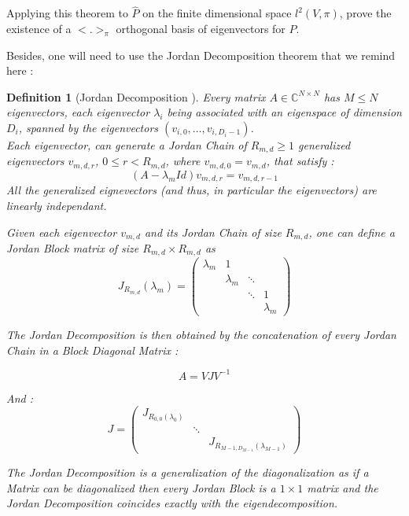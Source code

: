 \documentclass{article}
\newtheorem{definition}{Definition}[section]
\begin{document}
Applying this theorem to $\hat{P}$ on the finite dimensional space $l^2(V, \pi)$, prove the existence of a $<.>_{\pi}$ orthogonal basis of eigenvectors for $\hat{P}$.

Besides, one will need to use the Jordan Decomposition theorem that we remind here :

\begin{definition}[Jordan Decomposition \cite{sandryhaila_moura_2014}]\label{def:Jordan_decomposition}
Every matrix $A \in \mathbb{C}^{N \times N}$ has $M \leq N$ eigenvectors, each eigenvector $\lambda_i$ being associated with an eigenspace of dimension $D_i$, spanned by the eigenvectors $(v_{i,0}, \hdots, v_{i, D_i - 1})$.\\
Each eigenvector, can generate a \textit{Jordan Chain} of $R_{m,d} \geq 1$ \textit{generalized eigenvectors} $v_{m,d,r}$, $0 \leq r < R_{m,d}$, where $v_{m,d,0} = v_{m,d}$, that satisfy : 
\begin{equation}\label{eq:generalized_eigenvector_equation}
    (A - \lambda_m Id)v_{m,d,r} = v_{m,d,r-1}
\end{equation}
All the generalized eignevectors (and thus, in particular the eigenvectors) are linearly independant. 

Given each eigenvector $v_{m,d}$ and its Jordan Chain of size $R_{m,d}$, one can define a \textit{Jordan Block} matrix of size $R_{m,d} \times R_{m,d}$ as 
\begin{equation}
    J_{R_{m,d}}(\lambda_m) = \begin{pmatrix} \lambda_m & 1 & & \\ & \lambda_m & \ddots & \\ & & \ddots & 1   \\ & & & \lambda_m   \end{pmatrix}
\end{equation}

The Jordan Decomposition is then obtained by the concatenation of every Jordan Chain in a Block Diagonal Matrix :

\begin{equation}
    A = VJV^{-1}
\end{equation}

And :
\begin{equation}
    J = \begin{pmatrix} J_{R_{0,0}(\lambda_0)} & & \\
& \ddots & \\ & & J_{R_{M-1, D_{M-1}}(\lambda_{M-1})} \end{pmatrix}
\end{equation}

The Jordan Decomposition is a generalization of the diagonalization as if a Matrix can be diagonalized then every Jordan Block is a $1\times1$ matrix and the Jordan Decomposition coincides exactly with the eigendecomposition.

\end{definition}
\end{document}
